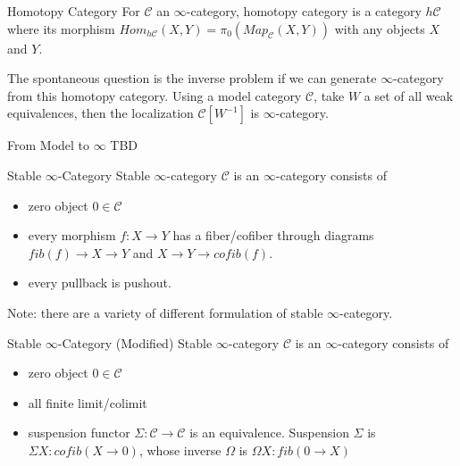 \documentclass{article}
\begin{document}
\begin{definition} {Homotopy Category}{}
For $\mathcal{C}$ an $\infty$-category, homotopy category is a category $h\mathcal{C}$ 
where its morphism $Hom_{h\mathcal{C}}(X,Y) = \pi_0(Map_{\mathcal{C}}(X,Y))$ with any objects $X$ and $Y$.
\end{definition}


\noindent
The spontaneous question is the inverse problem if we can generate $\infty$-category from this homotopy category.
Using a model category $\mathcal{C}$, take $W$ a set of all weak equivalences, then the localization $\mathcal{C}[W^{-1}]$ 
is $\infty$-category.

\begin{proposition} {From Model to $\infty$}{}
TBD
\end{proposition}


\begin{definition} {Stable $\infty$-Category}{}
Stable $\infty$-category $\mathcal{C}$ is an $\infty$-category consists of 

\begin{itemize}
\item zero object $0\in\mathcal{C}$
\item every morphism $f:X\to Y$ has a fiber/cofiber through diagrams $fib(f)\to X\to Y$ and $X\to Y\to cofib(f)$.
\item every pullback is pushout.
\end{itemize}
\end{definition}

\noindent
Note: there are a variety of different formulation of stable $\infty$-category. \\

\begin{definition} {Stable $\infty$-Category (Modified)}{}
Stable $\infty$-category $\mathcal{C}$ is an $\infty$-category consists of 

\begin{itemize}
\item zero object $0\in\mathcal{C}$
\item all finite limit/colimit
\item suspension functor $\Sigma:\mathcal{C}\to \mathcal{C}$ is an equivalence.
Suspension $\Sigma$ is $\Sigma X: cofib(X\to 0)$, whose inverse $\Omega$ is $\Omega X: fib(0\to X)$

\end{itemize}
\end{definition}
\end{document}
